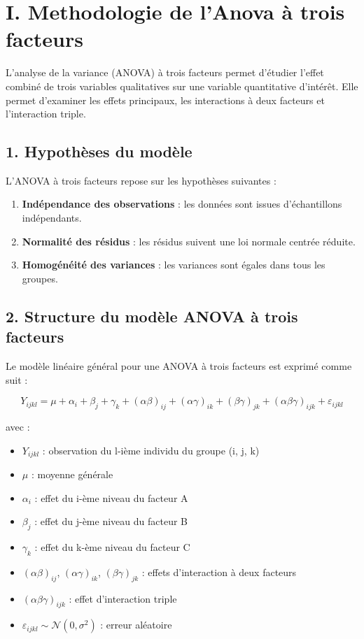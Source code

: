 \documentclass[
]{article}
\providecommand{\tightlist}{%
  \setlength{\itemsep}{0pt}\setlength{\parskip}{0pt}}
\begin{document}
\section{I. Methodologie de l'Anova à trois
facteurs}\label{i.-methodologie-de-lanova-uxe0-trois-facteurs}

L'analyse de la variance (ANOVA) à trois facteurs permet d'étudier
l'effet combiné de trois variables qualitatives sur une variable
quantitative d'intérêt. Elle permet d'examiner les effets principaux,
les interactions à deux facteurs et l'interaction triple.

\subsection{1. Hypothèses du modèle}\label{hypothuxe8ses-du-moduxe8le}

L'ANOVA à trois facteurs repose sur les hypothèses suivantes :

\begin{enumerate}
\def\labelenumi{\arabic{enumi}.}
\tightlist
\item
  \textbf{Indépendance des observations} : les données sont issues
  d'échantillons indépendants.
\item
  \textbf{Normalité des résidus} : les résidus suivent une loi normale
  centrée réduite.
\item
  \textbf{Homogénéité des variances} : les variances sont égales dans
  tous les groupes.
\end{enumerate}

\subsection{2. Structure du modèle ANOVA à trois
facteurs}\label{structure-du-moduxe8le-anova-uxe0-trois-facteurs}

Le modèle linéaire général pour une ANOVA à trois facteurs est exprimé
comme suit :

\[
Y_{ijkl} = \mu + \alpha_i + \beta_j + \gamma_k + (\alpha\beta)_{ij} + (\alpha\gamma)_{ik} + (\beta\gamma)_{jk} + (\alpha\beta\gamma)_{ijk} + \varepsilon_{ijkl}
\]

avec :

\begin{itemize}
\tightlist
\item
  \(Y_{ijkl}\) : observation du l-ième individu du groupe (i, j, k)
\item
  \(\mu\) : moyenne générale
\item
  \(\alpha_i\) : effet du i-ème niveau du facteur A
\item
  \(\beta_j\) : effet du j-ème niveau du facteur B
\item
  \(\gamma_k\) : effet du k-ème niveau du facteur C
\item
  \((\alpha\beta)_{ij}\), \((\alpha\gamma)_{ik}\),
  \((\beta\gamma)_{jk}\) : effets d'interaction à deux facteurs
\item
  \((\alpha\beta\gamma)_{ijk}\) : effet d'interaction triple
\item
  \(\varepsilon_{ijkl} \sim \mathcal{N}(0, \sigma^2)\) : erreur
  aléatoire
\end{itemize}
\end{document}
